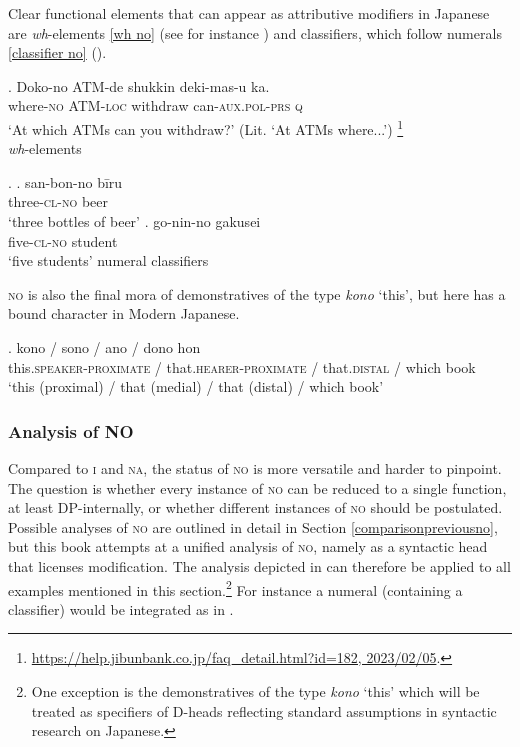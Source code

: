 Clear functional elements that can appear as attributive modifiers in Japanese are \textit{wh}-elements \ref{wh no} (see for instance \citealt{watanabe:2001:wh}) and classifiers, which follow numerals \ref{classifier no} (\citealt{saito:2008:N}).

\exg. Doko-no ATM-de shukkin deki-mas-u ka.\\
where-\textsc{no} ATM-\textsc{loc} withdraw can-\textsc{aux.pol-prs} \textsc{q}\\
`At which ATMs can you withdraw?’ (Lit. `At ATMs where...’) \label{wh no} \footnote{\url{https://help.jibunbank.co.jp/faq_detail.html?id=182, 2023/02/05}.} \\ \null \hfill \textit{wh}-elements

 \ex. \label{classifier no} \ag. san-bon-no bīru\\
three-\textsc{cl-no} beer\\
`three bottles of beer’ \label{sanbon}
\bg. go-nin-no gakusei\\
five-\textsc{cl-no} student\\
`five students’ \null \hfill numeral classifiers

\textsc{no} is also the final mora of demonstratives of the type \textit{kono} `this’, but here has a bound character in Modern Japanese.

\exg. kono / sono / ano / dono hon\\
this.\textsc{speaker-proximate} / that.\textsc{hearer-proximate} / that.\textsc{distal} / which book\\
`this (proximal) / that (medial)  / that (distal) / which book'

\subsubsection{Analysis of NO}

Compared to \textsc{i} and \textsc{na}, the status of \textsc{no} is more versatile and harder to pinpoint. The question is whether every instance of \textsc{no} can be reduced to a single function, at least DP-internally, or whether different instances of \textsc{no} should be postulated. Possible analyses of \textsc{no} are outlined in detail in Section \ref{comparisonpreviousno}, but this book attempts at a unified analysis of \textsc{no}, namely as a syntactic head that licenses modification. The analysis depicted in  can therefore be applied to all examples mentioned in this section.\footnote{One exception is the demonstratives of the type \textit{kono} `this’ which will be treated as specifiers of D-heads reflecting standard assumptions in syntactic research on Japanese.} For instance a numeral (containing a classifier) would be integrated as in .

